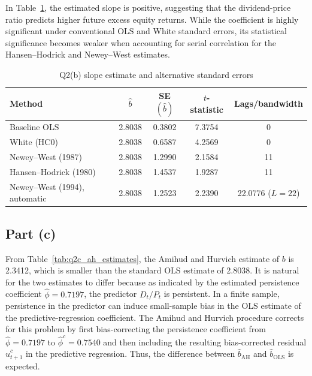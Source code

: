 \documentclass[11pt]{article}
\begin{document}
In Table~\ref{tab:q2b_standard_errors}, the estimated slope is positive, suggesting that the dividend-price ratio predicts higher future excess equity returns. While the coefficient is highly significant under conventional OLS and White standard errors, its statistical significance becomes weaker when accounting for serial correlation for the Hansen–Hodrick and Newey–West estimates.
\begin{table}[htbp]
    \centering
    \caption{Q2(b) slope estimate and alternative standard errors}
    \label{tab:q2b_standard_errors}
    \begin{tabular}{lcccc}
        \toprule
        Method & $\widehat b$ & SE$(\widehat b)$ & $t$-statistic & Lags/bandwidth \\
        \midrule
        Baseline OLS & 2.8038 & 0.3802 & 7.3754 & 0 \\
        White (HC0) & 2.8038 & 0.6587 & 4.2569 & 0 \\
        Newey--West (1987) & 2.8038 & 1.2990 & 2.1584 & 11 \\
        Hansen--Hodrick (1980) & 2.8038 & 1.4537 & 1.9287 & 11 \\
        Newey--West (1994), automatic & 2.8038 & 1.2523 & 2.2390 & 22.0776 ($L=22$) \\
        \bottomrule
    \end{tabular}
\end{table}
\clearpage

\subsection{Part (c)}
From Table~\ref{tab:q2c_ah_estimates}, the Amihud and Hurvich estimate of $b$ is 2.3412, which is smaller than the
standard OLS estimate of 2.8038. It is natural for the two
estimates to differ because as
indicated by the estimated persistence coefficient $\widehat{\phi}=0.7197$, the predictor $D_t/P_t$ is persistent.
In a finite sample, persistence in the predictor can induce small-sample
bias in the OLS estimate of the predictive-regression coefficient.
The Amihud and Hurvich procedure corrects for this problem by first
bias-correcting the persistence coefficient from $\widehat{\phi}=0.7197$
to $\widehat{\phi}^{c}=0.7540$ and then including the resulting
bias-corrected residual $\widehat{u}^{c}_{t+1}$ in the predictive regression.
Thus, the difference between $\widehat b_{\mathrm{AH}}$ and $\widehat b_{\mathrm{OLS}}$ is expected.
\end{document}
